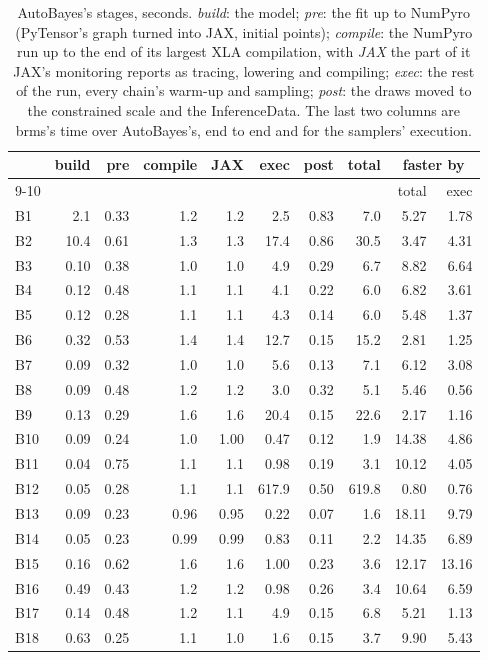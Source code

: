 \documentclass[11pt]{article}
\begin{document}
\begin{table}[H]
\footnotesize
\setlength{\tabcolsep}{4pt}
\begin{center}
\begin{tabular}{@{}lrrrrrrrrr@{}}
\toprule
& build & pre & compile & JAX & exec & post & total & \multicolumn{2}{c}{faster by} \\
\cmidrule(lr){9-10}& & & & & & & & total & exec \\
\midrule
B1 & 2.1 & 0.33 & 1.2 & 1.2 & 2.5 & 0.83 & 7.0 & 5.27 & 1.78 \\
B2 & 10.4 & 0.61 & 1.3 & 1.3 & 17.4 & 0.86 & 30.5 & 3.47 & 4.31 \\
B3 & 0.10 & 0.38 & 1.0 & 1.0 & 4.9 & 0.29 & 6.7 & 8.82 & 6.64 \\
B4 & 0.12 & 0.48 & 1.1 & 1.1 & 4.1 & 0.22 & 6.0 & 6.82 & 3.61 \\
B5 & 0.12 & 0.28 & 1.1 & 1.1 & 4.3 & 0.14 & 6.0 & 5.48 & 1.37 \\
B6 & 0.32 & 0.53 & 1.4 & 1.4 & 12.7 & 0.15 & 15.2 & 2.81 & 1.25 \\
B7 & 0.09 & 0.32 & 1.0 & 1.0 & 5.6 & 0.13 & 7.1 & 6.12 & 3.08 \\
B8 & 0.09 & 0.48 & 1.2 & 1.2 & 3.0 & 0.32 & 5.1 & 5.46 & 0.56 \\
B9 & 0.13 & 0.29 & 1.6 & 1.6 & 20.4 & 0.15 & 22.6 & 2.17 & 1.16 \\
B10 & 0.09 & 0.24 & 1.0 & 1.00 & 0.47 & 0.12 & 1.9 & 14.38 & 4.86 \\
B11 & 0.04 & 0.75 & 1.1 & 1.1 & 0.98 & 0.19 & 3.1 & 10.12 & 4.05 \\
B12 & 0.05 & 0.28 & 1.1 & 1.1 & 617.9 & 0.50 & 619.8 & 0.80 & 0.76 \\
B13 & 0.09 & 0.23 & 0.96 & 0.95 & 0.22 & 0.07 & 1.6 & 18.11 & 9.79 \\
B14 & 0.05 & 0.23 & 0.99 & 0.99 & 0.83 & 0.11 & 2.2 & 14.35 & 6.89 \\
B15 & 0.16 & 0.62 & 1.6 & 1.6 & 1.00 & 0.23 & 3.6 & 12.17 & 13.16 \\
B16 & 0.49 & 0.43 & 1.2 & 1.2 & 0.98 & 0.26 & 3.4 & 10.64 & 6.59 \\
B17 & 0.14 & 0.48 & 1.2 & 1.1 & 4.9 & 0.15 & 6.8 & 5.21 & 1.13 \\
B18 & 0.63 & 0.25 & 1.1 & 1.0 & 1.6 & 0.15 & 3.7 & 9.90 & 5.43 \\
\bottomrule
\end{tabular}\end{center}
\caption{\small AutoBayes's stages, seconds. \emph{build}: the model; \emph{pre}: the fit up to NumPyro (PyTensor's graph turned into JAX, initial points); \emph{compile}: the NumPyro run up to the end of its largest XLA compilation, with \emph{JAX} the part of it JAX's monitoring reports as tracing, lowering and compiling; \emph{exec}: the rest of the run, every chain's warm-up and sampling; \emph{post}: the draws moved to the constrained scale and the InferenceData. The last two columns are brms's time over AutoBayes's, end to end and for the samplers' execution.}\label{tab:autobayes}
\end{table}
\end{document}

